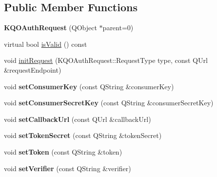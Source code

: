 \subsection*{Public Member Functions}
\begin{DoxyCompactItemize}
\item 
\mbox{\label{class_k_q_o_auth_request_a2a7741781a8a612af239a781fb17ce7b}} 
{\bfseries K\+Q\+O\+Auth\+Request} (Q\+Object $\ast$parent=0)
\item 
virtual bool \hyperlink{class_k_q_o_auth_request_a6a9de60901bae594ecbd3a95a5967ed9}{is\+Valid} () const
\item 
void \hyperlink{class_k_q_o_auth_request_a4b045494336db124c895c387859ed5a3}{init\+Request} (K\+Q\+O\+Auth\+Request\+::\+Request\+Type type, const Q\+Url \&request\+Endpoint)
\item 
\mbox{\label{class_k_q_o_auth_request_ab7753274e5d579b10f8a12b47d44b9a5}} 
void {\bfseries set\+Consumer\+Key} (const Q\+String \&consumer\+Key)
\item 
\mbox{\label{class_k_q_o_auth_request_a8f8d0cee5d8ba54fdeb517f7e05ccbc5}} 
void {\bfseries set\+Consumer\+Secret\+Key} (const Q\+String \&consumer\+Secret\+Key)
\item 
\mbox{\label{class_k_q_o_auth_request_adbe12b74c1bb13b4294fe45a95beaab8}} 
void {\bfseries set\+Callback\+Url} (const Q\+Url \&callback\+Url)
\item 
\mbox{\label{class_k_q_o_auth_request_ab547d713bdafad904316e2f15d6cf341}} 
void {\bfseries set\+Token\+Secret} (const Q\+String \&token\+Secret)
\item 
\mbox{\label{class_k_q_o_auth_request_a729f6fc47109d4b6fc241bc67c4f5bdd}} 
void {\bfseries set\+Token} (const Q\+String \&token)
\item 
\mbox{\label{class_k_q_o_auth_request_ad58385205905a3133e32f04fc335aff2}} 
void {\bfseries set\+Verifier} (const Q\+String \&verifier)
\item 
\mbox{\label{class_k_q_o_auth_request_ae4fb090910111c24c00f43ca4f32558a}} 

\end{DoxyCompactItemize}

